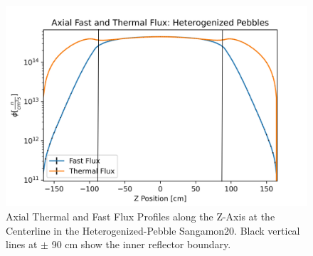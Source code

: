 \begin{figure}[H]
\centering

  \includegraphics[width=0.95\linewidth]{figures/fast_therm_flux_het_zv2.png}

\caption{Axial Thermal and Fast Flux Profiles along the Z-Axis at the Centerline in the Heterogenized-Pebble Sangamon20.  Black vertical lines at $\pm$ 90 cm show the inner reflector boundary.}
\label{fig:het-det-z}
\end{figure}